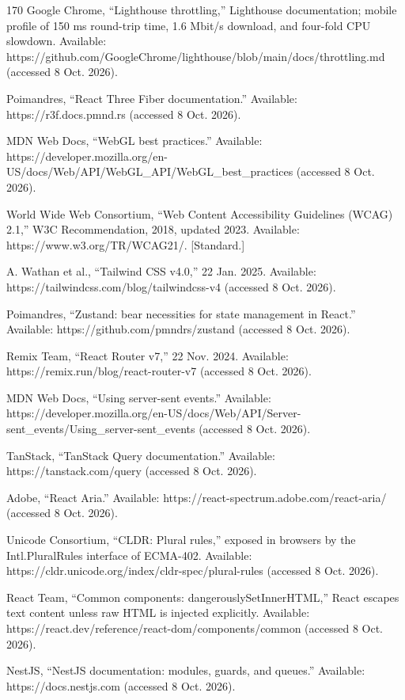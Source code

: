 \begin{thebibliography}{170}
 Google Chrome, ``Lighthouse throttling,'' Lighthouse documentation; mobile profile of 150 ms round-trip time, 1.6 Mbit/s download, and four-fold CPU slowdown. Available: https://github.com/GoogleChrome/lighthouse/blob/main/docs/throttling.md (accessed 8 Oct. 2026).

 Poimandres, ``React Three Fiber documentation.'' Available: https://r3f.docs.pmnd.rs (accessed 8 Oct. 2026).

 MDN Web Docs, ``WebGL best practices.'' Available: https://developer.mozilla.org/en-US/docs/Web/API/WebGL\_API/WebGL\_best\_practices (accessed 8 Oct. 2026).

 World Wide Web Consortium, ``Web Content Accessibility Guidelines (WCAG) 2.1,'' W3C Recommendation, 2018, updated 2023. Available: https://www.w3.org/TR/WCAG21/. [Standard.]

 A. Wathan et al., ``Tailwind CSS v4.0,'' 22 Jan. 2025. Available: https://tailwindcss.com/blog/tailwindcss-v4 (accessed 8 Oct. 2026).

 Poimandres, ``Zustand: bear necessities for state management in React.'' Available: https://github.com/pmndrs/zustand (accessed 8 Oct. 2026).

 Remix Team, ``React Router v7,'' 22 Nov. 2024. Available: https://remix.run/blog/react-router-v7 (accessed 8 Oct. 2026).

 MDN Web Docs, ``Using server-sent events.'' Available: https://developer.mozilla.org/en-US/docs/Web/API/Server-sent\_events/Using\_server-sent\_events (accessed 8 Oct. 2026).

 TanStack, ``TanStack Query documentation.'' Available: https://tanstack.com/query (accessed 8 Oct. 2026).

 Adobe, ``React Aria.'' Available: https://react-spectrum.adobe.com/react-aria/ (accessed 8 Oct. 2026).

 Unicode Consortium, ``CLDR: Plural rules,'' exposed in browsers by the Intl.PluralRules interface of ECMA-402. Available: https://cldr.unicode.org/index/cldr-spec/plural-rules (accessed 8 Oct. 2026).

 React Team, ``Common components: dangerouslySetInnerHTML,'' React escapes text content unless raw HTML is injected explicitly. Available: https://react.dev/reference/react-dom/components/common (accessed 8 Oct. 2026).

 NestJS, ``NestJS documentation: modules, guards, and queues.'' Available: https://docs.nestjs.com (accessed 8 Oct. 2026).


\end{thebibliography}
